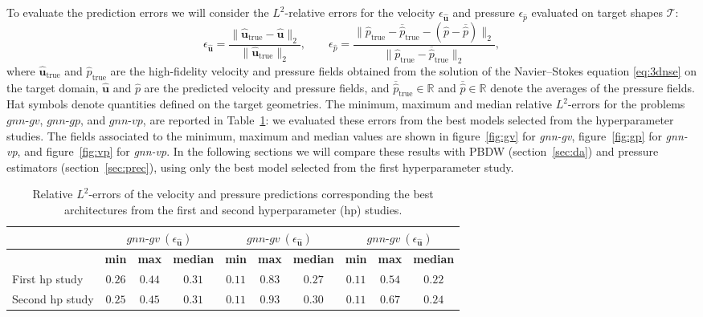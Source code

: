To evaluate the prediction errors we will consider the $L^2$-relative errors for the velocity $\epsilon_{\widehat{\mathbf{u}}}$ and pressure $\epsilon_{\widehat{p}}$ evaluated on target shapes $\mathcal{T}$:
\begin{equation}
  \label{eq:l2relerr}
  \epsilon_{\widehat{\mathbf{u}}} = \frac{\lVert \widehat{\mathbf{u}}_{\text{true}}-\widehat{\mathbf{u}}\rVert_2}{\lVert \widehat{\mathbf{u}}_{\text{true}}\rVert_2},\qquad\epsilon_{\widehat{p}} = \frac{\lVert \widehat{p}_{\text{true}}-\overline{\widehat{p}}_{\text{true}} -(\widehat{p}-\overline{\widehat{p}})\rVert_2}{\lVert \widehat{p}_{\text{true}}-\overline{{\widehat{p}}}_{\text{true}} \rVert_2},
\end{equation}
where $\widehat{\mathbf{u}}_{\text{true}}$ and $\widehat{p}_{\text{true}}$ are the high-fidelity velocity and pressure fields obtained from the solution of the Navier--Stokes equation \eqref{eq:3dnse} on the target domain, $\widehat{\mathbf{u}}$ and $\widehat{p}$ are the predicted velocity and pressure fields, and
$\overline{\widehat{p}}_{\text{true}}\in\mathbb{R}$ and $\overline{\widehat{p}}\in\mathbb{R}$ denote the averages of the pressure fields. Hat symbols denote quantities defined on the target geometries. The minimum, maximum and median relative $L^2$-errors for the problems $\textit{gnn-gv}$, $\textit{gnn-gp}$, and $\textit{gnn-vp}$, are reported in Table~\ref{tab:gnns}: we evaluated these errors from the best models selected from the hyperparameter studies. The fields associated to the minimum, maximum and median values are shown in figure~\ref{fig:gv} for \textit{gnn-gv}, figure~\ref{fig:gp} for \textit{gnn-vp}, and figure~\ref{fig:vp} for \textit{gnn-vp}. In the following sections we will compare these results with PBDW (section~\ref{sec:da}) and pressure estimators (section~\ref{sec:prec}), using only the best model selected from the first hyperparameter study.
\begin{table}[H]
  \centering
  \begin{tabular}{l|ccc|ccc|ccc}
 & \multicolumn{3}{c}{$\textit{gnn-gv}~(\epsilon_{\widehat{\mathbf{u}}})$} & \multicolumn{3}{|c}{$\textit{gnn-gv}~(\epsilon_{\widehat{\mathbf{u}}})$} & \multicolumn{3}{|c}{$\textit{gnn-gv}~(\epsilon_{\widehat{\mathbf{u}}})$}\\ \hline
& \textbf{min} & \textbf{max} & \textbf{median} & \textbf{min} & \textbf{max} & \textbf{median} & \textbf{min} & \textbf{max} & \textbf{median}\\
       \hline
      First hp study  & $0.26$ & $0.44$ & $0.31$ & $0.11$ & $0.83$ & $0.27$ & $0.11$ & $0.54$ & $0.22$ \\
      \hline
      Second hp study & $0.25$ & $0.45$ & $0.31$ & $0.11$ & $0.93$ & $0.30$ & $0.11$ & $0.67$ & $0.24$ \\
      \hline
  \end{tabular}\hspace{5mm}
  \caption{Relative $L^2$-errors of the velocity and pressure predictions corresponding the best architectures from the first and second hyperparameter (hp) studies.}
  \label{tab:gnns}
\end{table}
